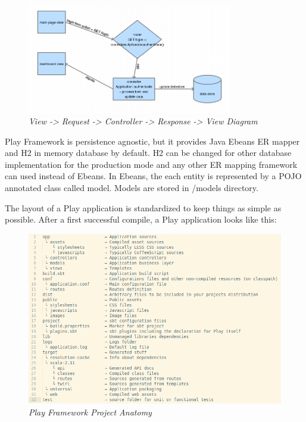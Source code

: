 \documentclass[12pt,twoside,a4paper]{report}
\begin{document}
\begin{figure}[!ht]
	\centering
		\includegraphics[width=0.8\textwidth, totalheight=7cm]
		{play_flowchart}
	\caption{\textit{View -> Request -> Controller -> Response -> View Diagram}}
	\label{f3.9.2}
\end{figure}

Play Framework is persistence agnostic, but it provides Java Ebeans ER mapper and H2 in memory database by default. H2 can be changed for other database implementation for the production mode and any other ER mapping framework can used instead of Ebeans. In Ebeans, the each entity is represented by a POJO annotated class called model. Models are stored in /models directory.

The layout of a Play application is standardized to keep things as simple as possible. After a first successful compile, a Play application looks like this:

\begin{figure}[!ht]
	\centering
		\includegraphics[width=1\textwidth, totalheight=10cm]
		{play_framework_project_anatomy}
	\caption{\textit{Play Framework Project Anatomy}}
	\label{f3.9.1}
\end{figure}
\end{document}
